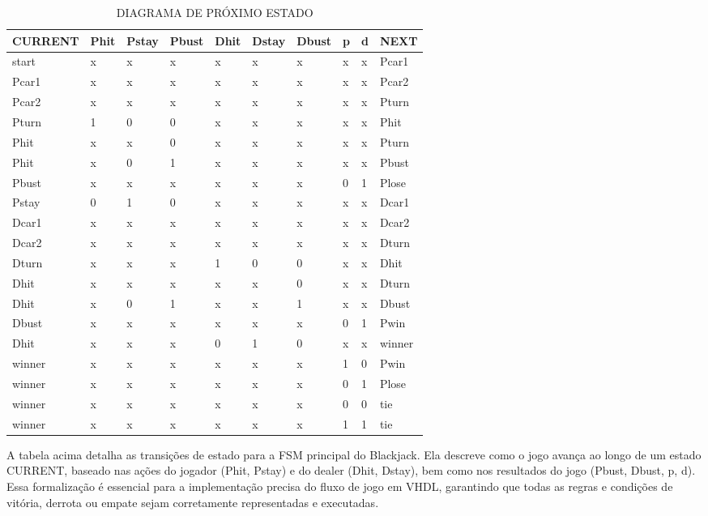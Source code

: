 \documentclass[oneside]{uffstex}
\begin{document}
\begin{table}[H]
    \centering
    \caption{DIAGRAMA DE PRÓXIMO ESTADO}
    \begin{tabular}{|p{2cm}|p{1cm}|p{1cm}|p{1cm}|p{1cm}|p{1cm}|p{1cm}|p{1cm}|p{1cm}|p{1.25cm}|}
        \hline
        CURRENT & Phit & Pstay & Pbust & Dhit & Dstay & Dbust & p & d & NEXT \\ 
        \hline
        start & x & x & x & x & x & x & x & x & Pcar1  \\
        \hline
        Pcar1 & x & x & x & x & x & x & x & x & Pcar2  \\
        \hline
        Pcar2 & x & x & x & x & x & x & x & x & Pturn  \\
        \hline
        Pturn & 1 & 0 & 0 & x & x & x & x & x & Phit  \\ 
        \hline
        Phit & x & x & 0 & x & x & x & x & x & Pturn  \\
        \hline
        Phit & x & 0 & 1 & x & x & x & x & x & Pbust  \\
        \hline
        Pbust & x & x & x & x & x & x & 0 & 1 & Plose  \\
        \hline
        Pstay & 0 & 1 & 0 & x & x & x & x & x & Dcar1  \\
        \hline
        Dcar1 & x & x & x & x & x & x & x & x & Dcar2  \\
        \hline
        Dcar2 & x & x & x & x & x & x & x & x & Dturn  \\
        \hline
        Dturn & x & x & x & 1 & 0 & 0 & x & x & Dhit  \\ 
        \hline
        Dhit & x & x & x & x & x & 0 & x & x & Dturn  \\
        \hline
        Dhit & x & 0 & 1 & x & x & 1 & x & x & Dbust  \\
        \hline
        Dbust & x & x & x & x & x & x & 0 & 1 & Pwin  \\
        \hline
        Dhit & x & x & x & 0 & 1 & 0 & x & x & winner  \\
        \hline
        winner & x & x & x & x & x & x & 1 & 0 & Pwin  \\
        \hline
        winner & x & x & x & x & x & x & 0 & 1 & Plose  \\
        \hline
        winner & x & x & x & x & x & x & 0 & 0 & tie  \\
        \hline
        winner & x & x & x & x & x & x & 1 & 1 & tie  \\
        \hline
    \end{tabular}
    \label{tab:blackjack}
\end{table}
A tabela acima detalha as transições de estado para a FSM principal do Blackjack. Ela descreve como o jogo avança ao longo de um estado CURRENT, baseado nas ações do jogador (Phit, Pstay) e do dealer (Dhit, Dstay), bem como nos resultados do jogo (Pbust, Dbust, p, d). Essa formalização é essencial para a implementação precisa do fluxo de jogo em VHDL, garantindo que todas as regras e condições de vitória, derrota ou empate sejam corretamente representadas e executadas.
\end{document}
